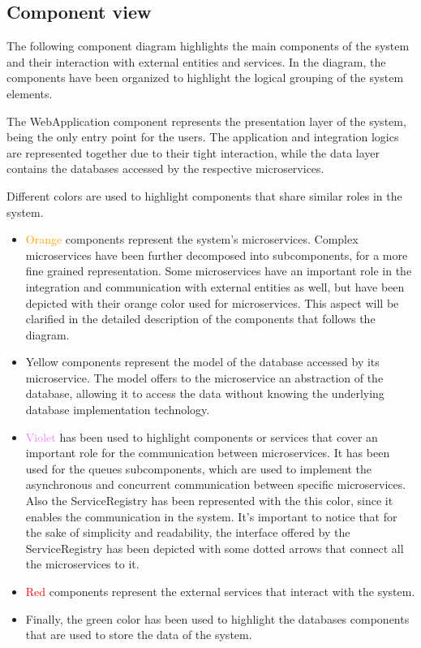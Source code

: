 \subsection{Component view}
The following component diagram highlights the main components of the system and their interaction with external entities and services. In the diagram, the components have been organized to highlight the logical grouping of the system elements.

The WebApplication component represents the presentation layer of the system, being the only entry point for the users. The application and integration logics are represented together due to their tight interaction, while the data layer contains the databases accessed by the respective microservices.

Different colors are used to highlight components that share similar roles in the system.
\begin{itemize}
    \item \textcolor{orange}{Orange} components represent the system's microservices. Complex microservices have been further decomposed into subcomponents, for a more fine grained representation. Some microservices have an important role in the integration and communication with external entities as well, but have been depicted with their orange color used for microservices. This aspect will be clarified in the detailed description of the components that follows the diagram.
    \item \textcolor{myyellow}{Yellow} components represent the model of the database accessed by its microservice. The model offers to the microservice an abstraction of the database, allowing it to access the data without knowing the underlying database implementation technology.
    \item \textcolor{violet}{Violet} has been used to highlight components or services that cover an important role for the communication between microservices. It has been used for the queues subcomponents, which are used to implement the asynchronous and concurrent communication between specific microservices. Also the ServiceRegistry has been represented with the this color, since it enables the communication in the system. It's important to notice that for the sake of simplicity and readability, the interface offered by the ServiceRegistry has been depicted with some dotted arrows that connect all the microservices to it.
    \item \textcolor{red}{Red} components represent the external services that interact with the system.
    \item Finally, the \textcolor{mygreen}{green} color has been used to highlight the databases components that are used to store the data of the system.
\end{itemize}

